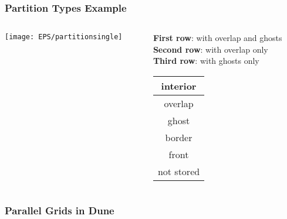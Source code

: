 \begin{frame}[fragile]
\frametitle{Partition Types Example}
\begin{columns}[c]
\begin{column}{0.7\textwidth}

\texttt{[image: EPS/partitionsingle]}
\end{column}
\begin{column}{0.3\textwidth}
\vskip0.5cm
\textbf{First row}: with overlap and ghosts\\
\textbf{Second row}: with overlap only\\
\textbf{Third row}: with ghosts only
\vskip5mm
\begin{center}
\begin{tabular}{|c|}
\hline\color{red} interior\\\hline
\color{green} overlap\\\hline
\color{yellow} ghost\\\hline
\color{blue} border\\\hline
\color{magenta} front\\\hline
\color{gray} not stored\\\hline
\end{tabular}
\end{center}
\end{column}
\end{columns}

\end{frame}

\subsubsection{Parallel Grids in Dune}

